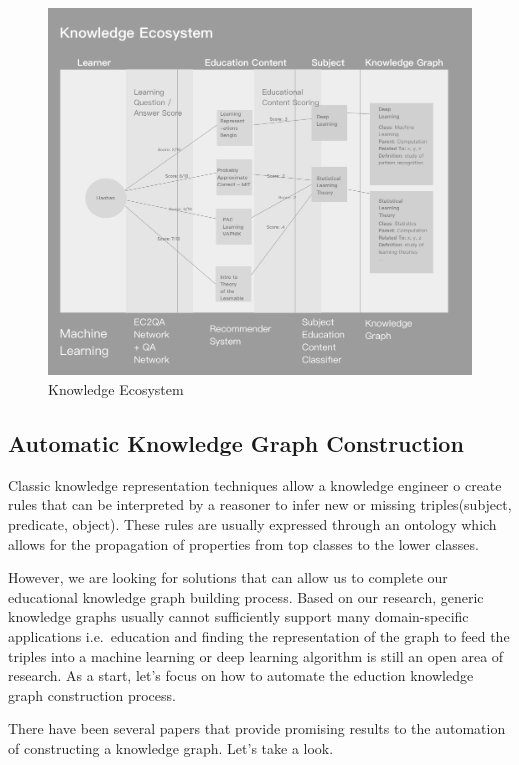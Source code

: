 \documentclass[]{book}
\theoremstyle{definition}
\theoremstyle{definition}
\theoremstyle{definition}
\theoremstyle{remark}
\begin{document}
\begin{figure}
\centering
\includegraphics{img/knowledgeEcosystem.png}
\caption{Knowledge Ecosystem}
\end{figure}

\subsection{Automatic Knowledge Graph
Construction}\label{automatic-knowledge-graph-construction}

Classic knowledge representation techniques allow a knowledge engineer o
create rules that can be interpreted by a reasoner to infer new or
missing triples(subject, predicate, object). These rules are usually
expressed through an ontology which allows for the propagation of
properties from top classes to the lower classes.

However, we are looking for solutions that can allow us to complete our
educational knowledge graph building process. Based on our research,
generic knowledge graphs usually cannot sufficiently support many
domain-specific applications i.e.~education and finding the
representation of the graph to feed the triples into a machine learning
or deep learning algorithm is still an open area of research. As a
start, let's focus on how to automate the eduction knowledge graph
construction process.

There have been several papers that provide promising results to the
automation of constructing a knowledge graph. Let's take a look.
\end{document}

